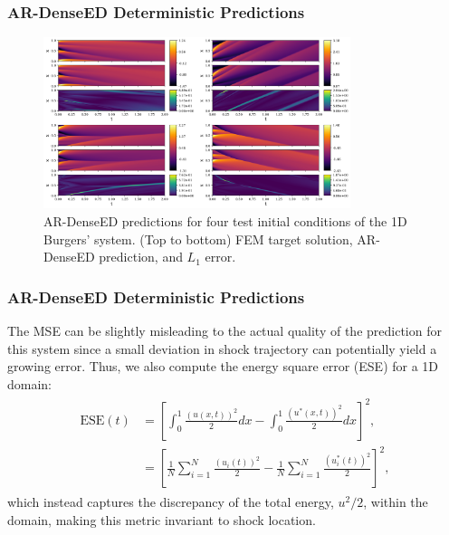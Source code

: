 \documentclass{beamer}
\theoremstyle{remark}
\begin{document}
\begin{frame}
\frametitle{AR-DenseED Deterministic Predictions}
\begin{figure}[H]
    \centering
    \includegraphics[width=0.8\textwidth]{Fig10.png}
    \caption{AR-DenseED predictions for four test initial conditions of the 1D Burgers' system. (Top to bottom) FEM target solution, AR-DenseED prediction, and $L_1$ error.}
    \label{fig:burgers1D-ARDenseED}
\end{figure}
\end{frame}

\begin{frame}
\frametitle{AR-DenseED Deterministic Predictions}
The MSE can be slightly misleading to the actual quality of the prediction for this system since a small deviation in shock trajectory can potentially yield a growing error.
Thus, we also compute the energy square error (ESE) for a 1D domain:
\begin{align}
    \begin{split}
        \textrm{ESE}(t) &= \left[\int_{0}^{1} \frac{(u(x,t))^{2}}{2} dx - \int_{0}^{1}\frac{(u^{*}(x,t))^{2}}{2} dx\right]^{2},\\
        &= \left[\frac{1}{N}\sum^{N}_{i=1}\frac{(u_{i}(t))^{2}}{2} - \frac{1}{N}\sum^{N}_{i=1}\frac{(u_{i}^{*}(t))^{2}}{2}\right]^{2},
        \label{eq:ese}
    \end{split}
\end{align}
which instead captures the discrepancy of the total energy, $u^{2}/2$, within the domain, making this metric invariant to shock location.

\end{frame}
\end{document}
